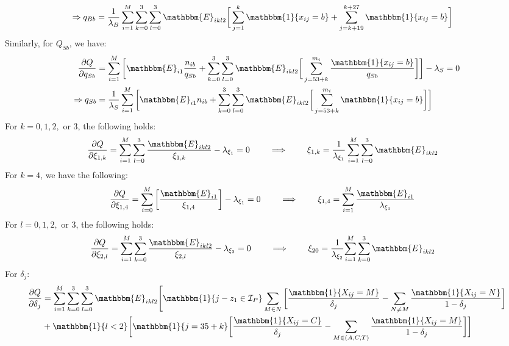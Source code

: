 \documentclass[10pt]{article}
\begin{document}
\begin{enumerate}[label = \textbf{\arabic*.}]
\begin{align}
            \Rightarrow q_{Bb}&=\frac{1}{\lambda_B}\sum_{i=1}^M\sum_{k=0}^3\sum_{l=0}^3\mathbbm{E}_{ikl2}\bigg[\sum_{j=1}^{k}\mathbbm{1}\{x_{ij}=b\}+\sum_{j=k+19}^{k+27}\mathbbm{1}\{x_{ij}=b\}  \bigg]
        \end{align}
        Similarly, for $Q_{Sb}$, we have:
        \begin{align}
            \frac{\partial Q}{\partial q_{Sb}}&=\sum_{i=1}^{M}\bigg[\mathbbm{E}_{i1}\frac{n_{ib}}{q_{Sb}}+\sum_{k=0}^3\sum_{l=0}^3\mathbbm{E}_{ikl2}\bigg[\sum_{j=53+k}^{m_i}\frac{\mathbbm{1}\{x_{ij}=b\}}{q_{Sb}}\bigg] \bigg]-\lambda_S=0\nonumber\\
            \Rightarrow q_{Sb}&=\frac{1}{\lambda_S}\sum_{i=1}^{M}\bigg[\mathbbm{E}_{i1}{n_{ib}}+\sum_{k=0}^3\sum_{l=0}^3\mathbbm{E}_{ikl2}\bigg[\sum_{j=53+k}^{m_i}\mathbbm{1}\{x_{ij}=b\}\bigg] \bigg]
        \end{align}
        For $k = 0, 1, 2,$ or $3$, the following holds:
        \begin{align}
            \frac{\partial Q}{\partial \xi_{1,k}}&=\sum_{i=1}^M\sum_{l=0}^3\frac{\mathbbm{E}_{ikl2}}{\xi_{1,k}}-\lambda_{\xi_1}=0\qquad\implies\qquad
             \xi_{1,k}=\frac{1}{\lambda_{\xi_{1}}}\sum_{i=1}^M\sum_{l=0}^3\mathbbm{E}_{ikl2}
        \end{align}
        For $k = 4$, we have the following:
        \begin{align}
            \frac{\partial Q}{\partial \xi_{1,4}}&=\sum_{i=0}^M\bigg[\frac{\mathbbm{E}_{i1}}{\xi_{1,4}}\bigg] - \lambda_{\xi_{1}}= 0\qquad\implies\qquad
            \xi_{1,4}=\sum_{i=1}^M\frac{\mathbbm{E}_{i1}}{\lambda_{\xi_1}}
        \end{align}
        For $l = 0, 1, 2,$ or $3$, the following holds:
        \begin{align}
            \frac{\partial Q}{\partial \xi_{2,l}}&=\sum_{i=1}^M\sum_{k=0}^3\frac{\mathbbm{E}_{ikl2}}{\xi_{2,l}}-\lambda_{\xi_2}=0\qquad\implies\qquad
            \xi_{20}=\frac{1}{{\lambda_{\xi_{2}}}}{\sum_{i=1}^M\sum_{k=0}^3\mathbbm{E}_{ikl2}}
        \end{align}
        For $\delta_j$:
        \begin{align}
            \frac{\partial Q}{\partial\delta_j} &= \sum_{i=1}^M\sum_{k=0}^3\sum_{l=0}^3\mathbbm{E}_{ikl2}\Bigg[\mathbbm{1}\{j - z_1 \in \mathcal{I}_P\}\sum_{M\in N}\bigg[\frac{\mathbbm{1}\{X_{ij}=M\}}{\delta_j}-\sum_{N\neq M}\frac{\mathbbm{1}\{X_{ij}=N\}}{1-\delta_j} \bigg]\\\nonumber
            &+\mathbbm{1}\{l<2\}\bigg[\mathbbm{1}\{j=35+k\}\bigg[\frac{\mathbbm{1}\{X_{ij}=C\}}{\delta_j} - \sum_{M \in (A,C,T)}\frac{\mathbbm{1}\{X_{ij}=M\}}{1-\delta_j} \bigg]\bigg] \\\nonumber

\end{align}
\end{enumerate}
\end{document}
